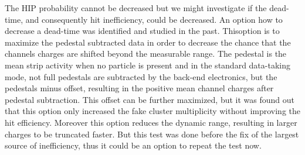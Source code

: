 The HIP probability cannot be decreased but we might investigate if the dead-time, and consequently hit inefficiency, could be decreased. An option how to decrease a dead-time was identified and studied in the past. Thisoption is to maximize the pedestal subtracted data in order to decrease the chance that the channels charges are shifted beyond the measurable range. The pedestal is the mean strip activity when no particle is present and in the standard data-taking mode, not full pedestals are subtracted by the back-end electronics, but the pedestals minus offset, resulting in the positive mean channel charges after pedestal subtraction. This offset can be further maximized, but it was found out that this option only increased the fake cluster multiplicity without improving the hit efficiency. Moreover this option reduces the dynamic range, resulting in larger charges to be truncated faster. But this test was done before the fix of the largest source of inefficiency, thus it could be an option to repeat the test now.



